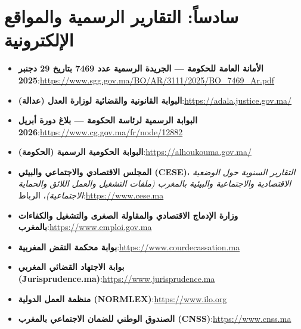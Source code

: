 \section*{سادساً: التقارير الرسمية والمواقع الإلكترونية}
\begin{itemize}[leftmargin=*, itemsep=5pt]
    \item \textbf{الأمانة العامة للحكومة --- الجريدة الرسمية عدد \textenglish{7469} بتاريخ \textenglish{29} دجنبر \textenglish{2025}}:\newline \url{https://www.sgg.gov.ma/BO/AR/3111/2025/BO_7469_Ar.pdf}
    \item \textbf{البوابة القانونية والقضائية لوزارة العدل (عدالة)}:\newline \url{https://adala.justice.gov.ma/}
    \item \textbf{البوابة الرسمية لرئاسة الحكومة --- بلاغ دورة أبريل \textenglish{2026}}:\newline \url{https://www.cg.gov.ma/fr/node/12882}
    \item \textbf{البوابة الحكومية الرسمية (الحكومة)}:\newline \url{https://alhoukouma.gov.ma/}
    \item \textbf{المجلس الاقتصادي والاجتماعي والبيئي (\textenglish{CESE})}، \textit{التقارير السنوية حول الوضعية الاقتصادية والاجتماعية والبيئية بالمغرب (ملفات التشغيل والعمل اللائق والحماية الاجتماعية)}، الرباط:\newline \url{https://www.cese.ma}
    \item \textbf{وزارة الإدماج الاقتصادي والمقاولة الصغرى والتشغيل والكفاءات بالمغرب}:\newline \url{https://www.emploi.gov.ma}
    \item \textbf{بوابة محكمة النقض المغربية}:\newline \url{https://www.courdecassation.ma}
    \item \textbf{بوابة الاجتهاد القضائي المغربي (\textenglish{Jurisprudence.ma})}:\newline \url{https://www.jurisprudence.ma}
    \item \textbf{منظمة العمل الدولية (\textenglish{NORMLEX})}:\newline \url{https://www.ilo.org}
    \item \textbf{الصندوق الوطني للضمان الاجتماعي بالمغرب (\textenglish{CNSS})}:\newline \url{https://www.cnss.ma}
\end{itemize}
